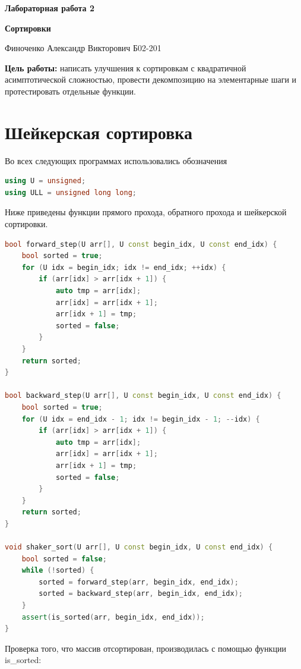 \documentclass[a4paper,12pt]{article}
\author{Финоченко Александр}
\title{}
\date{\today}
\begin{document}
\begin{center}
\Large{
\textbf{Лабораторная работа 2}

\textbf{Сортировки}

Финоченко Александр Викторович Б02-201
}

\end{center}
\large

\textbf{Цель работы:} написать улучшения к сортировкам с квадратичной асимптотической сложностью, провести декомпозицию на элементарные шаги и
протестировать отдельные функции.

\section*{Шейкерская сортировка}
Во всех следующих программах использовались обозначения

\begin{lstlisting}[language=C++]
using U = unsigned;
using ULL = unsigned long long;
\end{lstlisting}

Ниже приведены функции прямого прохода, обратного прохода и шейкерской сортировки. 

\begin{lstlisting}[language=C++]
bool forward_step(U arr[], U const begin_idx, U const end_idx) {
    bool sorted = true;
    for (U idx = begin_idx; idx != end_idx; ++idx) {
        if (arr[idx] > arr[idx + 1]) {
            auto tmp = arr[idx];
            arr[idx] = arr[idx + 1];
            arr[idx + 1] = tmp;
            sorted = false;
        }
    }
    return sorted;
}

bool backward_step(U arr[], U const begin_idx, U const end_idx) {
    bool sorted = true;
    for (U idx = end_idx - 1; idx != begin_idx - 1; --idx) {
        if (arr[idx] > arr[idx + 1]) {
            auto tmp = arr[idx];
            arr[idx] = arr[idx + 1];
            arr[idx + 1] = tmp;
            sorted = false;
        }
    }
    return sorted;
}

void shaker_sort(U arr[], U const begin_idx, U const end_idx) {
    bool sorted = false;
    while (!sorted) {
        sorted = forward_step(arr, begin_idx, end_idx);
        sorted = backward_step(arr, begin_idx, end_idx);
    }
    assert(is_sorted(arr, begin_idx, end_idx));
}
\end{lstlisting}

\newpage
Проверка того, что массив отсортирован, производилась с помощью функции is\_sorted:
\end{document}
